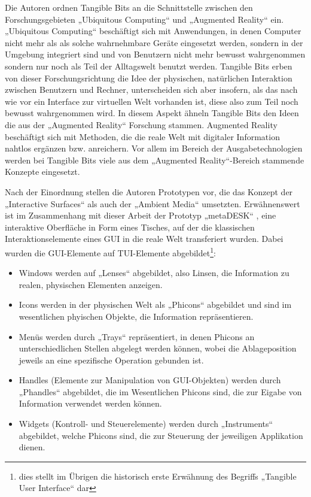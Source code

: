 Die Autoren ordnen Tangible Bits an die Schnittstelle zwischen den Forschungsgebieten „Ubiquitous Computing“ und „Augmented Reality“ ein. „Ubiquitous Computing“ \citep{Weiser91} beschäftigt sich mit Anwendungen, in denen Computer nicht mehr als als solche wahrnehmbare Geräte eingesetzt werden, sondern in der Umgebung integriert sind und von Benutzern nicht mehr bewusst wahrgenommen sondern nur noch als Teil der Alltagswelt benutzt werden. Tangible Bits erben von dieser Forschungsrichtung die Idee der physischen, natürlichen Interaktion zwischen Benutzern und Rechner, unterscheiden sich aber insofern, als das nach wie vor ein Interface zur virtuellen Welt vorhanden ist, diese also zum Teil noch bewusst wahrgenommen wird. In diesem Aspekt ähneln Tangible Bits den Ideen die aus der „Augmented Reality“ Forschung stammen. Augmented Reality beschäftigt sich mit Methoden, die die reale Welt mit digitaler Information nahtlos ergänzen bzw. anreichern. Vor allem im Bereich der Ausgabetechnologien werden bei Tangible Bits viele aus dem „Augmented Reality“-Bereich stammende Konzepte eingesetzt.

Nach der Einordnung stellen die Autoren Prototypen vor, die das Konzept der „Interactive Surfaces“ als auch der „Ambient Media“ umsetzten. Erwähnenswert ist im Zusammenhang mit dieser Arbeit der Prototyp „metaDESK“ \citep{Ullmer97}, eine interaktive Oberfläche in Form eines Tisches, auf der die klassischen Interaktionselemente eines \gls{GUI} in die reale Welt transferiert wurden. Dabei wurden die \gls{GUI}-Elemente auf \gls{TUI}-Elemente abgebildet\footnote{dies stellt im Übrigen die historisch erste Erwähnung des Begriffs „Tangible User Interface“ dar}: 
\begin{itemize}
	\item Windows werden auf „Lenses“ abgebildet, also Linsen, die Information zu realen, physischen Elementen anzeigen.
	\item Icons werden in der physischen Welt als „Phicons“ abgebildet und sind im wesentlichen phyischen Objekte, die Information repräsentieren.
	\item Menüs werden durch „Trays“ repräsentiert, in denen Phicons an unterschiedlichen Stellen abgelegt werden können, wobei die Ablageposition jeweils an eine spezifische Operation gebunden ist. 
	\item Handles (Elemente zur Manipulation von GUI-Objekten) werden durch „Phandles“ abgebildet, die im Wesentlichen Phicons sind, die zur Eigabe von Information verwendet werden können.
	\item Widgets (Kontroll- und Steuerelemente) werden durch „Instruments“ abgebildet, welche Phicons sind, die zur Steuerung der jeweiligen Applikation dienen.
\end{itemize}

